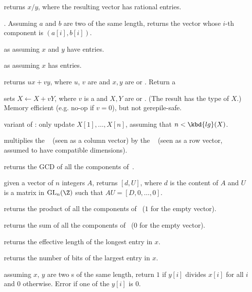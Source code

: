  returns $x/y$, where the resulting vector
has rational entries.

. Assuming $a$ and $b$ are two 
of the same length, returns the vector whose $i$-th component
is $(a[i], b[i])$.

 as  assuming $x$
and $y$ have  entries.

 as  assuming $x$
has  entries.

 returns $ux + vy$, where
$u$, $v$ are  and $x,y$ are  or . Return a 

 sets $X\leftarrow X +
vY$, where $v$ is a  and $X,Y$ are  or . (The result
has the type of $X$.) Memory efficient (e.g. no-op if $v = 0$), but not
gerepile-safe.

variant of : only update $X[1], \dots, X[n]$,
assuming that $n < \kbd{lg}(X)$.

 multiplies the ~
(seen as a column vector) by the ~ (seen as a row vector,
assumed to have compatible dimensions).

 returns the GCD of all the components
of~.

 given a vector of $n$ integers $A$, returns $[d,
U]$, where $d$ is the content of $A$ and $U$ is a matrix
in $\text{GL}_n(\Z)$ such that $AU = [D,0, \dots,0]$.

 returns the product of all the components
of~ ($1$ for the empty vector).

 returns the sum of all the components
of~ ($0$ for the empty vector).

 returns the effective length of the longest
entry in $x$.

 returns the number of bits of the largest
entry in $x$.

 assuming $x$, $y$ are two s of the same
length, return $1$ if $y[i]$ divides $x[i]$ for all $i$ and $0$ otherwise.
Error if one of the $y[i]$ is $0$.

